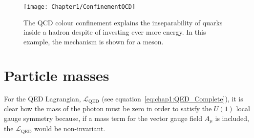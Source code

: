 
\begin{figure}[h]
    \centering
    \texttt{[image: Chapter1/ConfinementQCD]}
    \caption{The QCD colour confinement explains the inseparability of quarks inside a hadron despite of investing ever more energy. In this example, the mechanism is shown for a meson.}
\label{fig:Chap1:colorConfinement}\end{figure}




\section{Particle masses}
\label{sec:chap1:ParticleMasses}
For the QED Lagrangian, $\mathcal{L}_{\text{QED}}$  (see equation~\ref{eq:chap1:QED_Complete}), 
it is clear how the mass of the photon must be zero in order to satisfy the $U(1)$ local gauge symmetry because,
if a mass term for the vector gauge field $A_{\mu}$ is included, the $\mathcal{L}_{\text{QED}}$ would 
be non-invariant.

